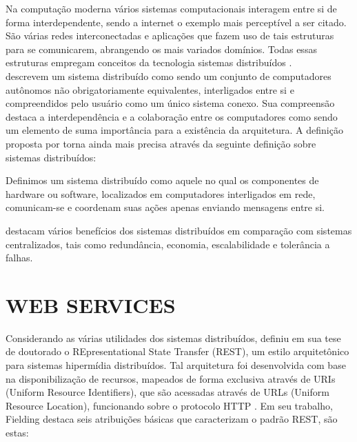 Na computação moderna vários sistemas computacionais interagem entre si de forma interdependente, sendo a internet o exemplo mais perceptível a ser citado. São várias redes interconectadas e aplicações que fazem uso de tais estruturas para se comunicarem, abrangendo os mais variados domínios. Todas essas estruturas empregam conceitos da tecnologia sistemas distribuídos \cite{puder2011distributed}.\\
 descrevem um sistema distribuído como sendo um conjunto de computadores autônomos não obrigatoriamente equivalentes, interligados entre si e compreendidos pelo usuário como um único sistema conexo. Sua compreensão destaca a interdependência e a colaboração entre os computadores como sendo um elemento de suma importância para a existência da arquitetura. A definição proposta por  torna ainda mais precisa através da seguinte definição sobre sistemas distribuídos:

\begin{citacao}
	Definimos um sistema distribuído como aquele no qual os componentes de hardware ou software, localizados em computadores interligados em rede, comunicam-se e coordenam suas ações apenas enviando mensagens entre si.
\end{citacao}

 destacam vários benefícios dos sistemas distribuídos em comparação com sistemas centralizados, tais como redundância, economia, escalabilidade e tolerância a falhas.

\section{WEB SERVICES}

Considerando as várias utilidades dos sistemas distribuídos,  definiu em sua tese de doutorado o REpresentational State Transfer (REST),  um estilo arquitetônico para sistemas hipermídia distribuídos. Tal arquitetura foi desenvolvida com base na disponibilização de recursos, mapeados de forma exclusiva através de URIs (Uniform Resource Identifiers), que são acessadas através de URLs (Uniform Resource Location), funcionando sobre o protocolo HTTP \cite{richardson2008restful}. Em seu trabalho, Fielding destaca seis atribuições básicas que caracterizam o padrão REST, são estas:


